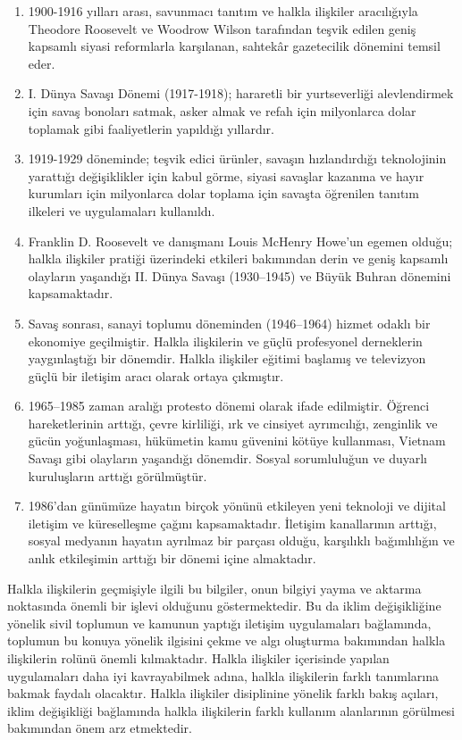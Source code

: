\documentclass[
]{book}
\providecommand{\tightlist}{%
  \setlength{\itemsep}{0pt}\setlength{\parskip}{0pt}}
\begin{document}
\begin{enumerate}
\def\labelenumi{\arabic{enumi}.}
\tightlist
\item
  1900-1916 yılları arası, savunmacı tanıtım ve halkla ilişkiler aracılığıyla Theodore Roosevelt ve Woodrow Wilson tarafından teşvik edilen geniş kapsamlı siyasi reformlarla karşılanan, sahtekâr gazetecilik dönemini temsil eder.
\item
  I. Dünya Savaşı Dönemi (1917-1918); hararetli bir yurtseverliği alevlendirmek için savaş bonoları satmak, asker almak ve refah için milyonlarca dolar toplamak gibi faaliyetlerin yapıldığı yıllardır.
\item
  1919-1929 döneminde; teşvik edici ürünler, savaşın hızlandırdığı teknolojinin yarattığı değişiklikler için kabul görme, siyasi savaşlar kazanma ve hayır kurumları için milyonlarca dolar toplama için savaşta öğrenilen tanıtım ilkeleri ve uygulamaları kullanıldı.
\item
  Franklin D. Roosevelt ve danışmanı Louis McHenry Howe'un egemen olduğu; halkla ilişkiler pratiği üzerindeki etkileri bakımından derin ve geniş kapsamlı olayların yaşandığı II. Dünya Savaşı (1930--1945) ve Büyük Buhran dönemini kapsamaktadır.
\item
  Savaş sonrası, sanayi toplumu döneminden (1946--1964) hizmet odaklı bir ekonomiye geçilmiştir. Halkla ilişkilerin ve güçlü profesyonel derneklerin yaygınlaştığı bir dönemdir. Halkla ilişkiler eğitimi başlamış ve televizyon güçlü bir iletişim aracı olarak ortaya çıkmıştır.
\item
  1965--1985 zaman aralığı protesto dönemi olarak ifade edilmiştir. Öğrenci hareketlerinin arttığı, çevre kirliliği, ırk ve cinsiyet ayrımcılığı, zenginlik ve gücün yoğunlaşması, hükümetin kamu güvenini kötüye kullanması, Vietnam Savaşı gibi olayların yaşandığı dönemdir. Sosyal sorumluluğun ve duyarlı kuruluşların arttığı görülmüştür.
\item
  1986'dan günümüze hayatın birçok yönünü etkileyen yeni teknoloji ve dijital iletişim ve küreselleşme çağını kapsamaktadır. İletişim kanallarının arttığı, sosyal medyanın hayatın ayrılmaz bir parçası olduğu, karşılıklı bağımlılığın ve anlık etkileşimin arttığı bir dönemi içine almaktadır.
\end{enumerate}

Halkla ilişkilerin geçmişiyle ilgili bu bilgiler, onun bilgiyi yayma ve aktarma noktasında önemli bir işlevi olduğunu göstermektedir. Bu da iklim değişikliğine yönelik sivil toplumun ve kamunun yaptığı iletişim uygulamaları bağlamında, toplumun bu konuya yönelik ilgisini çekme ve algı oluşturma bakımından halkla ilişkilerin rolünü önemli kılmaktadır. Halkla ilişkiler içerisinde yapılan uygulamaları daha iyi kavrayabilmek adına, halkla ilişkilerin farklı tanımlarına bakmak faydalı olacaktır. Halkla ilişkiler disiplinine yönelik farklı bakış açıları, iklim değişikliği bağlamında halkla ilişkilerin farklı kullanım alanlarının görülmesi bakımından önem arz etmektedir.
\end{document}
